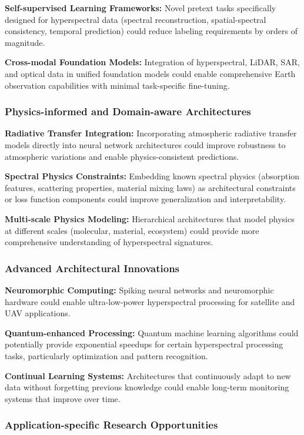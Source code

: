 \documentclass[journal]{IEEEtran}
\begin{document}
\textbf{Self-supervised Learning Frameworks:} Novel pretext tasks specifically designed for hyperspectral data (spectral reconstruction, spatial-spectral consistency, temporal prediction) could reduce labeling requirements by orders of magnitude.

\textbf{Cross-modal Foundation Models:} Integration of hyperspectral, LiDAR, SAR, and optical data in unified foundation models could enable comprehensive Earth observation capabilities with minimal task-specific fine-tuning.

\subsubsection{Physics-informed and Domain-aware Architectures}

\textbf{Radiative Transfer Integration:} Incorporating atmospheric radiative transfer models directly into neural network architectures could improve robustness to atmospheric variations and enable physics-consistent predictions.

\textbf{Spectral Physics Constraints:} Embedding known spectral physics (absorption features, scattering properties, material mixing laws) as architectural constraints or loss function components could improve generalization and interpretability.

\textbf{Multi-scale Physics Modeling:} Hierarchical architectures that model physics at different scales (molecular, material, ecosystem) could provide more comprehensive understanding of hyperspectral signatures.

\subsubsection{Advanced Architectural Innovations}

\textbf{Neuromorphic Computing:} Spiking neural networks and neuromorphic hardware could enable ultra-low-power hyperspectral processing for satellite and UAV applications.

\textbf{Quantum-enhanced Processing:} Quantum machine learning algorithms could potentially provide exponential speedups for certain hyperspectral processing tasks, particularly optimization and pattern recognition.

\textbf{Continual Learning Systems:} Architectures that continuously adapt to new data without forgetting previous knowledge could enable long-term monitoring systems that improve over time.

\subsubsection{Application-specific Research Opportunities}
\end{document}
